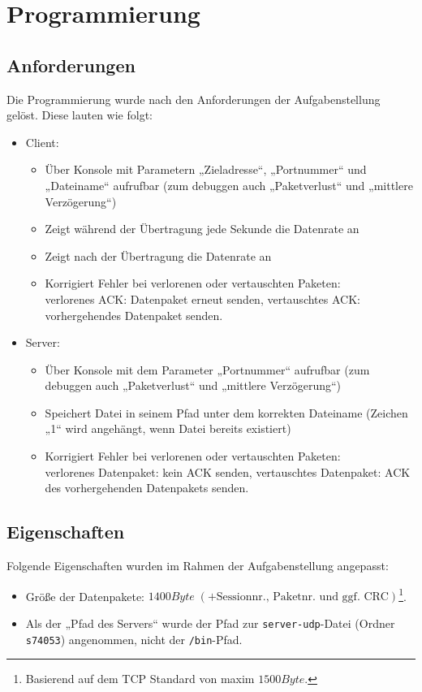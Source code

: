 \section{Programmierung}
\label{programing}

\subsection{Anforderungen}
Die Programmierung wurde nach den Anforderungen der Aufgabenstellung gelöst. Diese lauten wie folgt:
\begin{itemize}
\item Client:
\begin{itemize}
\item Über Konsole mit Parametern „Zieladresse“, „Portnummer“ und „Dateiname“ aufrufbar (zum debuggen auch „Paketverlust“ und „mittlere Verzögerung“)
\item Zeigt während der Übertragung jede Sekunde die Datenrate an
\item Zeigt nach der Übertragung die Datenrate an
\item Korrigiert Fehler bei verlorenen oder vertauschten Paketen:\\
verlorenes ACK: Datenpaket erneut senden, vertauschtes ACK: vorhergehendes Datenpaket senden.
\end{itemize}
\item Server:
\begin{itemize}
\item Über Konsole mit dem Parameter „Portnummer“ aufrufbar (zum debuggen auch „Paketverlust“ und „mittlere Verzögerung“)
\item Speichert Datei in seinem Pfad unter dem korrekten Dateiname (Zeichen „1“ wird angehängt, wenn Datei bereits existiert)
\item Korrigiert Fehler bei verlorenen oder vertauschten Paketen:\\
verlorenes Datenpaket: kein ACK senden, vertauschtes Datenpaket: ACK des vorhergehenden Datenpakets senden.
\end{itemize}
\end{itemize}
\subsection{Eigenschaften}
Folgende Eigenschaften wurden im Rahmen der Aufgabenstellung angepasst:
\begin{itemize}
\item Größe der Datenpakete: $1400 \unit{Byte}\;(+\text{Sessionnr., Paketnr. und ggf. CRC})$\footnote{Basierend auf dem TCP Standard von maxim $1500 \unit{Byte}$.}.
\item Als der „Pfad des Servers“ wurde der Pfad zur \texttt{server-udp}-Datei (Ordner \texttt{s74053}) angenommen, nicht der \texttt{/bin}-Pfad.
\end{itemize}

